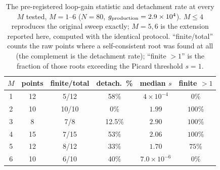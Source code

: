 \documentclass[aps,physrev,reprint,superscriptaddress,amsmath,amssymb,floatfix]{revtex4-2}
\begin{document}
\begin{table}[t]
\caption{The pre-registered loop-gain statistic and detachment rate at
every $M$ tested, $M=1$--$6$ ($N=80$, $g_{\rm production}=2.9\times10^4$).
$M\leq4$ reproduces the original sweep exactly; $M=5,6$ is the extension
reported here, computed with the identical protocol. ``finite/total''
counts the raw points where a self-consistent root was found at all
(the complement is the detachment rate); ``finite $>1$'' is the fraction
of those roots exceeding the Picard threshold $s=1$.}
\label{tab:m56extension}
\begin{ruledtabular}
\begin{tabular}{cccccc}
$M$ & points & finite/total & detach.\ \% & median $s$ & finite $>1$ \\
\hline
1 & 12 & 5/12  & 58\%   & $4\times10^{-4}$   & $0\%$   \\
2 & 10 & 10/10 & 0\%    & $1.99$             & $100\%$ \\
3 & 8  & 7/8   & 12.5\% & $2.90$             & $100\%$ \\
4 & 15 & 7/15  & 53\%   & $2.06$             & $100\%$ \\
5 & 12 & 8/12  & 33\%   & $1.70$             & $75\%$  \\
6 & 10 & 6/10  & 40\%   & $7.0\times10^{-6}$ & $0\%$   \\
\end{tabular}
\end{ruledtabular}
\end{table}
\end{document}
